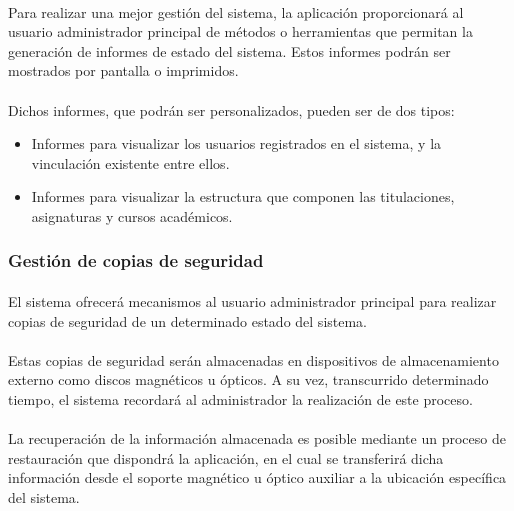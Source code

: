       \paragraph{}Para realizar una mejor gestión del sistema, la aplicación
      proporcionará al usuario administrador principal de métodos o herramientas
      que permitan la generación de informes de estado del sistema. Estos
      informes podrán ser mostrados por pantalla o imprimidos.

      \paragraph{}Dichos informes, que podrán ser personalizados, pueden ser
      de dos tipos:

      \begin{itemize}
       \item Informes para visualizar los usuarios registrados en el sistema, y
             la vinculación existente entre ellos.
       \item Informes para visualizar la estructura que componen las
             titulaciones, asignaturas y cursos académicos.
      \end{itemize}

      \subsubsection{Gestión de copias de seguridad}

      \paragraph{}El sistema ofrecerá mecanismos al usuario administrador
      principal para realizar copias de seguridad de un determinado estado del
      sistema.

      \paragraph{}Estas copias de seguridad serán almacenadas en dispositivos
      de almacenamiento externo como discos magnéticos u ópticos. A su vez,
      transcurrido determinado tiempo, el sistema recordará al administrador
      la realización de este proceso.

      \paragraph{}La recuperación de la información almacenada es posible
      mediante un proceso de restauración que dispondrá la aplicación, en el
      cual se transferirá dicha información desde el soporte magnético u
      óptico auxiliar a la ubicación específica del sistema.

